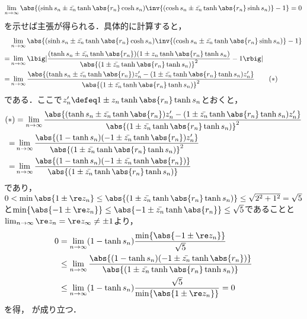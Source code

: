 \begin{ncalcof}
    
  \begin{align*}
    \lim_{n\to \infty}\abs{(\sinh s_n \pm \bar{z_n} \tanh \abs{r_n} \cosh s_n)\inv{(\cosh s_n \pm \bar{z_n} \tanh \abs{r_n} \sinh s_n) } - 1} = 0
  \end{align*}
  を示せば主張が得られる．具体的に計算すると，
  \begin{align}
    &\lim_{n\to \infty}\abs{(\sinh s_n \pm \bar{z_n} \tanh \abs{r_n} \cosh s_n)\inv{(\cosh s_n \pm \bar{z_n} \tanh \abs{r_n} \sinh s_n) } - 1}\notag \\
    = & \lim_{n\to \infty}\lbig|\frac{(\tanh s_n\pm \bar{z_n}\tanh \abs{r_n})(1 \pm z_n \tanh\abs{r_n}\tanh s_n )}{\abs{(1 \pm \bar{z_n} \tanh\abs{r_n}\tanh s_n )}^2} - 1 \rbig|\notag \\    
    = & \lim_{n\to \infty}\frac{\abs{(\tanh s_n\pm \bar{z_n}\tanh \abs{r_n})z_n' - (1 \pm \bar{z_n} \tanh\abs{r_n}\tanh s_n )z_n' }}{\abs{(1 \pm \bar{z_n} \tanh\abs{r_n}\tanh s_n )}^2}\label{eq:ast} \tag{$\ast$}
  \end{align}
  である．ここで$ z_n'\defeq 1 \pm z_n\tanh\abs{r_n}\tanh s_n$とおくと，
  \begin{align*}
    (\ast) &= \lim_{n\to \infty}\frac{\abs{(\tanh s_n\pm \bar{z_n}\tanh \abs{r_n})z_n' - (1 \pm \bar{z_n} \tanh\abs{r_n}\tanh s_n )z_n' }}{\abs{(1 \pm \bar{z_n} \tanh\abs{r_n}\tanh s_n )}^2}\\
    = & \lim_{n\to \infty}\frac{\abs{(1-\tanh s_n)(-1\pm \bar{z_n}\tanh \abs{r_n} )z_n'}}{\abs{(1 \pm \bar{z_n} \tanh\abs{r_n}\tanh s_n )}^2} \\
    = & \lim_{n\to \infty}\frac{\abs{(1-\tanh s_n)(-1\pm \bar{z_n}\tanh \abs{r_n} )}}{\abs{(1 \pm \bar{z_n} \tanh\abs{r_n}\tanh s_n )}} 
  \end{align*}
  であり，
  $0 < \min{\abs{1\pm \re z_n}}\leq  \abs{(1 \pm \bar{z_n} \tanh\abs{r_n}\tanh s_n )}\leq \sqrt{2^2 + 1^2} = \sqrt{5} $と$\min\{\abs{-1\pm \re z_n } \}  \leq \abs{-1\pm\bar{z_n}\tanh \abs{r_n} } \leq \sqrt{5} $であることと$\lim_{n\to \infty} \re z_n = \re z_{\infty} \neq \pm 1$より，
    \begin{align*}
      0 &= \lim_{n\to \infty}(1-\tanh s_n)\frac{\min\{\abs{-1\pm \re z_n} \}}{\sqrt{5}} \\
        &\leq \lim_{n\to \infty}\frac{\abs{(1-\tanh s_n)(-1\pm \bar{z_n}\tanh \abs{r_n} )}}{\abs{(1 \pm \bar{z_n} \tanh\abs{r_n}\tanh s_n )}}\\
      &\leq \lim_{n\to \infty}(1-\tanh s_n)\frac{\sqrt{5}}{\min\{\abs{1\pm \re z_n} \}} = 0
    \end{align*}
    を得， が成り立つ．
\end{ncalcof}


